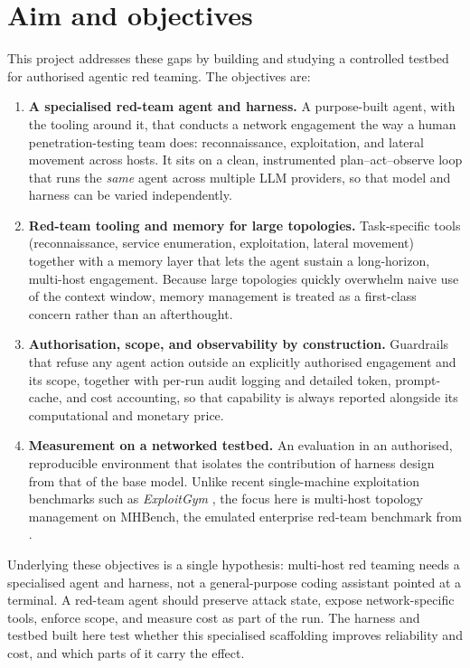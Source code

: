 \documentclass[12pt,oneside]{report}
\begin{document}
\section{Aim and objectives}
This project addresses these gaps by building and studying a controlled testbed
for authorised agentic red teaming. The objectives are:
\begin{enumerate}
    \item \textbf{A specialised red-team agent and harness.} A purpose-built
          agent, with the tooling around it, that conducts a network engagement
          the way a human penetration-testing team does: reconnaissance,
          exploitation, and lateral movement across hosts. It sits on a clean,
          instrumented plan--act--observe loop that runs the \emph{same} agent
          across multiple LLM providers, so that model and harness can be varied
          independently.
    \item \textbf{Red-team tooling and memory for large topologies.}
          Task-specific tools (reconnaissance, service enumeration, exploitation,
          lateral movement) together with a memory layer that lets the agent
          sustain a long-horizon, multi-host engagement. Because large topologies
          quickly overwhelm naive use of the context window, memory management
          is treated as a first-class concern rather than an afterthought.
    \item \textbf{Authorisation, scope, and observability by construction.}
          Guardrails that refuse any agent action outside an explicitly
          authorised engagement and its scope, together with per-run audit
          logging and detailed token, prompt-cache, and cost accounting, so that
          capability is always reported alongside its computational and monetary
          price.
    \item \textbf{Measurement on a networked testbed.} An evaluation in an
          authorised, reproducible environment that isolates the contribution of
          harness design from that of the base model. Unlike recent
          single-machine exploitation benchmarks such as \emph{ExploitGym}
          \citep{wang2026exploitgym}, the focus here is multi-host topology
          management on MHBench, the emulated enterprise red-team benchmark from
          \citet{singer2025incalmo}.
\end{enumerate}

Underlying these objectives is a single hypothesis: multi-host red teaming needs
a specialised agent and harness, not a general-purpose coding assistant pointed
at a terminal. A red-team agent should preserve attack state, expose
network-specific tools, enforce scope, and measure cost as part of the run. The
harness and testbed built here test whether this specialised scaffolding improves
reliability and cost, and which parts of it carry the effect.
\end{document}
